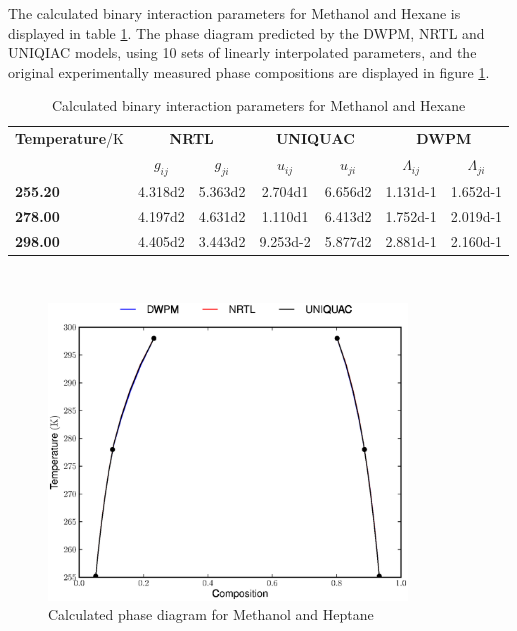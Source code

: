 \clearpage


The calculated binary interaction parameters for Methanol and Hexane is displayed in table \ref{methanol-hexaneTable}. The phase diagram predicted by the DWPM, NRTL and UNIQIAC models, using 10 sets of linearly interpolated parameters, and the original experimentally measured phase compositions are displayed in figure \ref{methanol-hexaneFigure}.\\

\begin{landscape}
\vspace*{\fill}
\begin{table}[h]
\caption{Calculated binary interaction parameters for Methanol and Hexane} 
\centering
\begin{tabular}{lcccccc}
\toprule
\textbf{Temperature}/$\mathrm{K}$&\multicolumn{2}{c}{\textbf{NRTL}}&\multicolumn{2}{c}{\textbf{UNIQUAC}}&\multicolumn{2}{c}{\textbf{DWPM}}\\
\cmidrule(r){2-7}
&$g_{ij}$&$g_{ji}$&$u_{ij}$&$u_{ji}$&$\Lambda_{ij}$&$\Lambda_{ji}$\\
\midrule
\textbf{ 255.20 } & \num{4.318d2} & \num{5.363d2} & \num{2.704d1} & \num{6.656d2} & \num{1.131d-1} & \num{1.652d-1}\\
\textbf{ 278.00 } & \num{4.197d2} & \num{4.631d2} & \num{1.110d1} & \num{6.413d2} & \num{1.752d-1} & \num{2.019d-1}\\
\textbf{ 298.00 } & \num{4.405d2} & \num{3.443d2} & \num{9.253d-2} & \num{5.877d2} & \num{2.881d-1} & \num{2.160d-1}\\
\bottomrule
\end{tabular}\\
\label{methanol-hexaneTable}
\end{table}
\vspace*{\fill}
\end{landscape}

\begin{figure}[hp]
\centering
\includegraphics[width = 0.85\textwidth]{Results_Parts/BinaryParams/methanol-hexane/PhaseDiagram.eps}
\caption{Calculated phase diagram for Methanol and Heptane} \label{methanol-hexaneFigure}
\end{figure}\

\clearpage